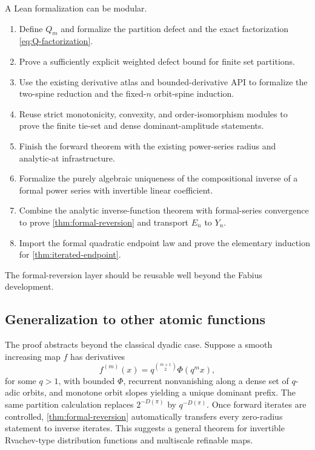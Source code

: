 \documentclass[11pt,oneside]{article}
\theoremstyle{definition}
\theoremstyle{remark}
\begin{document}
A Lean formalization can be modular.
\begin{enumerate}[label=\arabic*.]
 \item Define $Q_m$ and formalize the partition defect and the exact factorization
 \eqref{eq:Q-factorization}.
 \item Prove a sufficiently explicit weighted defect bound for finite set partitions.
 \item Use the existing derivative atlas and bounded-derivative API to formalize the
 two-spine reduction and the fixed-$n$ orbit-spine induction.
 \item Reuse strict monotonicity, convexity, and order-isomorphism modules to prove the
 finite tie-set and dense dominant-amplitude statements.
 \item Finish the forward theorem with the existing power-series radius and analytic-at
 infrastructure.
 \item Formalize the purely algebraic uniqueness of the compositional inverse of a
 formal power series with invertible linear coefficient.
 \item Combine the analytic inverse-function theorem with formal-series convergence to
 prove \cref{thm:formal-reversion} and transport $E_n$ to $Y_n$.
 \item Import the formal quadratic endpoint law and prove the elementary induction for
 \cref{thm:iterated-endpoint}.
\end{enumerate}
The formal-reversion layer should be reusable well beyond the Fabius development.

\subsection{Generalization to other atomic functions}

The proof abstracts beyond the classical dyadic case.  Suppose a smooth increasing map
$f$ has derivatives
\begin{equation}
 f^{(m)}(x)=q^{\binom{m+1}{2}}\Phi(q^m x),
 \label{eq:q-atomic-derivatives}
\end{equation}
for some $q>1$, with bounded $\Phi$, recurrent nonvanishing along a dense set of
$q$-adic orbits, and monotone orbit slopes yielding a unique dominant prefix.  The same
partition calculation replaces $2^{-D(\pi)}$ by $q^{-D(\pi)}$.  Once forward iterates
are controlled, \cref{thm:formal-reversion} automatically transfers every zero-radius
statement to inverse iterates.  This suggests a general theorem for invertible
Rvachev-type distribution functions and multiscale refinable maps.
\end{document}

